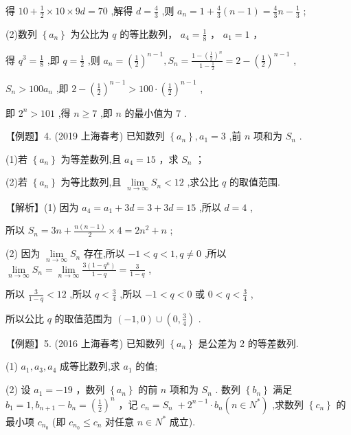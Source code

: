 \documentclass[10pt]{article}
\begin{document}
得 \({10} + \frac{1}{2} \times  {10} \times  {9d} = {70}\) ,解得 \(d = \frac{4}{3}\) ,则 \({a}_{n} = 1 + \frac{4}{3}\left( {n - 1}\right)  = \frac{4}{3}n - \frac{1}{3}\) ;

(2)数列 \(\left\{  {a}_{n}\right\}\) 为公比为 \(q\) 的等比数列， \({a}_{4} = \frac{1}{8}\) ， \({a}_{1} = 1\) ，

得 \({q}^{3} = \frac{1}{8}\) ,即 \(q = \frac{1}{2}\) ,则 \({a}_{n} = {\left( \frac{1}{2}\right) }^{n - 1},{S}_{n} = \frac{1 - {\left( \frac{1}{2}\right) }^{n}}{1 - \frac{1}{2}} = 2 - {\left( \frac{1}{2}\right) }^{n - 1}\) ,

\({S}_{n} > {100}{a}_{n}\) ,即 \(2 - {\left( \frac{1}{2}\right) }^{n - 1} > {100} \cdot  {\left( \frac{1}{2}\right) }^{n - 1}\) ,

即 \({2}^{n} > {101}\) ,得 \(n \geq  7\) ,即 \(n\) 的最小值为 7 .

【例题】4. (2019 上海春考) 已知数列 \(\left\{  {a}_{n}\right\}  ,{a}_{1} = 3\) ,前 \(n\) 项和为 \({S}_{n}\) .

(1)若 \(\left\{  {a}_{n}\right\}\) 为等差数列,且 \({a}_{4} = {15}\) ，求 \({S}_{n}\) ；

(2)若 \(\left\{  {a}_{n}\right\}\) 为等比数列,且 \(\mathop{\lim }\limits_{{n \rightarrow  \infty }}{S}_{n} < {12}\) ,求公比 \(q\) 的取值范围.

【解析】(1) 因为 \({a}_{4} = {a}_{1} + {3d} = 3 + {3d} = {15}\) ,所以 \(d = 4\) ,

所以 \({S}_{n} = {3n} + \frac{n\left( {n - 1}\right) }{2} \times  4 = 2{n}^{2} + n\) ;

(2) 因为 \(\mathop{\lim }\limits_{{n \rightarrow  \infty }}{S}_{n}\) 存在,所以 \(- 1 < q < 1,q \neq  0\) ,所以 \(\mathop{\lim }\limits_{{n \rightarrow  \infty }}{S}_{n} = \mathop{\lim }\limits_{{n \rightarrow  \infty }}\frac{3\left( {1 - {q}^{n}}\right) }{1 - q} = \frac{3}{1 - q}\) ,

所以 \(\frac{3}{1 - q} < {12}\) ,所以 \(q < \frac{3}{4}\) ,所以 \(- 1 < q < 0\) 或 \(0 < q < \frac{3}{4}\) ,

所以公比 \(q\) 的取值范围为 \(\left( {-1,0}\right)  \cup  \left( {0,\frac{3}{4}}\right)\) .

【例题】5. (2016 上海春考) 已知数列 \(\left\{  {a}_{n}\right\}\) 是公差为 2 的等差数列.

(1) \({a}_{1},{a}_{3},{a}_{4}\) 成等比数列,求 \({a}_{1}\) 的值;

(2) 设 \({a}_{1} =  - {19}\) ，数列 \(\left\{  {a}_{n}\right\}\) 的前 \(n\) 项和为 \({S}_{n}\) . 数列 \(\left\{  {b}_{n}\right\}\) 满足 \({b}_{1} = 1,{b}_{n + 1} - {b}_{n} = {\left( \frac{1}{2}\right) }^{n}\) ，记 \({c}_{n} = {S}_{n} \; + {2}^{n - 1} \cdot  {b}_{n}\left( {n \in  {N}^{ * }}\right)\) ,求数列 \(\left\{  {c}_{n}\right\}\) 的最小项 \({c}_{{n}_{0}}\) (即 \({c}_{{n}_{0}} \leq  {c}_{n}\) 对任意 \(n \in  {N}^{ * }\) 成立).
\end{document}
